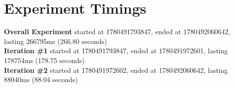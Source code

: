 \documentclass{article}
\begin{document}
\section*{Experiment Timings}
\textbf{Overall Experiment} started at 1780491793847, ended at 1780492060642, lasting 266795ms (266.80 seconds)
\\\textbf{Iteration \#1} started at 1780491793847, ended at 1780491972601, lasting 178754ms (178.75 seconds)
\\\textbf{Iteration \#2} started at 1780491972602, ended at 1780492060642, lasting 88040ms (88.04 seconds)
\end{document}
